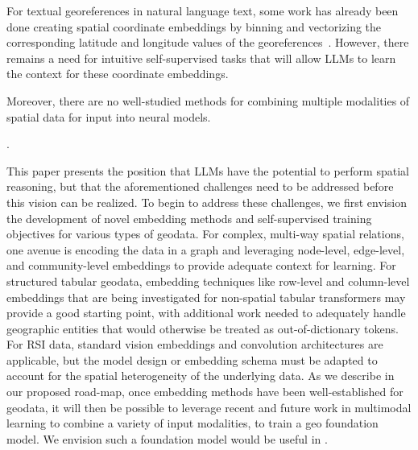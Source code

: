 For textual georeferences in natural language text, some work has already been done creating spatial coordinate embeddings by binning and vectorizing the corresponding latitude and longitude values of the georeferences~\cite{Li2021}.
However, there remains a need for intuitive self-supervised tasks that will allow LLMs to learn the context for these coordinate embeddings.
%

Moreover, there are no well-studied methods for combining multiple modalities of spatial data for input into neural models.

 \cite{Trappolini2023}.

This paper presents the position that LLMs have the potential to perform spatial reasoning, but that the aforementioned challenges need to be addressed before this vision can be realized.
%
To begin to address these challenges, we first envision the development of novel embedding methods and self-supervised training objectives for various types of geodata.
%
For complex, multi-way spatial relations, one avenue is encoding the data in a graph and leveraging node-level, edge-level, and community-level embeddings to provide adequate context for learning.
For structured tabular geodata, embedding techniques like row-level and column-level embeddings that are being investigated for non-spatial tabular transformers may provide a good starting point, with additional work needed to adequately handle geographic entities that would otherwise be treated as out-of-dictionary tokens.
For RSI data, standard vision embeddings and convolution architectures are applicable, but the model design or embedding schema must be adapted to account for the spatial heterogeneity of the underlying data.
%
As we describe in our proposed road-map, once embedding methods have been well-established for geodata, it will then be possible to leverage recent and future work in multimodal learning to combine a variety of input modalities, to train a geo foundation model.
%
We envision such a foundation model would be useful in .

